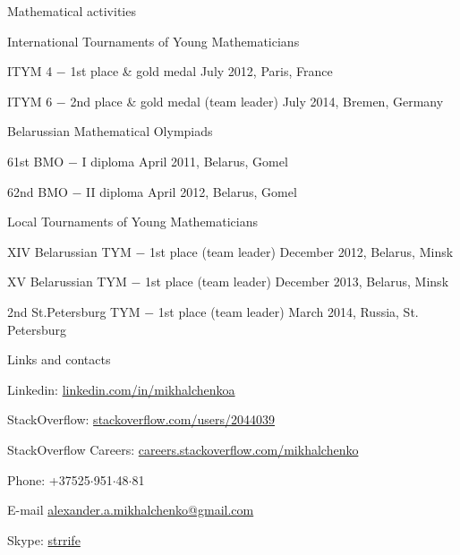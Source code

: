\documentclass{resume} %
\begin{document}
\begin{rSection}{Mathematical activities}

\begin{rSubsection}{International Tournaments of Young Mathematicians}{}{}

\item ITYM 4 $-$ 1st place \& gold medal \hfill July 2012, Paris, France
\item ITYM 6 $-$ 2nd place \& gold medal (team leader) \hfill July 2014, Bremen, Germany

\end{rSubsection}

\begin{rSubsection}{Belarussian Mathematical Olympiads}{}{}

\item 61st BMO $-$ I diploma \hfill  April 2011, Belarus, Gomel
\item 62nd BMO $-$ II diploma \hfill April 2012, Belarus, Gomel
\end{rSubsection}


\begin{rSubsection}{Local Tournaments of Young Mathematicians}{}{}

\item XIV Belarussian TYM $-$ 1st place (team leader) \hfill December 2012, Belarus, Minsk
\item XV Belarussian TYM $-$ 1st place (team leader) \hfill December 2013, Belarus, Minsk
\item 2nd St.Petersburg TYM $-$ 1st place (team leader) \hfill March 2014, Russia, St. Petersburg
\end{rSubsection}

\end{rSection}

\clearpage

\begin{rSection}{Links and contacts}

\item Linkedin: \href{http://linkedin.com/in/mikhalchenkoa}{linkedin.com/in/mikhalchenkoa}
\item StackOverflow: \href{http://stackoverflow.com/users/2044039}{stackoverflow.com/users/2044039}
\item StackOverflow Careers: \href{http://careers.stackoverflow.com/mikhalchenko}{careers.stackoverflow.com/mikhalchenko}
\item Phone: +37525$\cdot$951$\cdot$48$\cdot$81
\item E-mail \href{mailto:alexander.a.mikhalchenko@gmail.com}{alexander.a.mikhalchenko@gmail.com}
\item Skype: \href{skype:strrife}{strrife}
\end{rSection}
\end{document}
